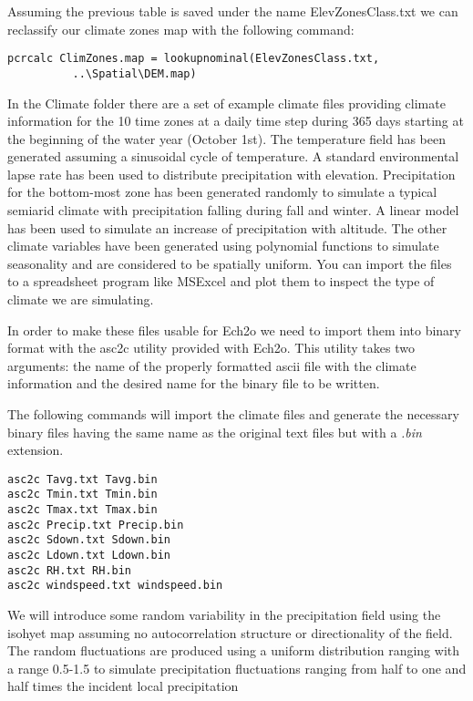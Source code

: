 Assuming the previous table is saved under the name \textsf{ElevZonesClass.txt} we can reclassify our climate zones map with the following command:

\begin{verbatim}
pcrcalc ClimZones.map = lookupnominal(ElevZonesClass.txt,
          ..\Spatial\DEM.map)
\end{verbatim}
 
 In the \textsf{Climate} folder there are a set of example climate files providing climate information for the 10 time zones at a daily time step during 365 days starting at the beginning of the water year (October 1st). The temperature field has been generated assuming a sinusoidal cycle of temperature. A standard environmental lapse rate has been used to distribute precipitation with elevation. Precipitation for the bottom-most zone has been generated randomly to simulate a typical semiarid climate with precipitation falling during fall and winter. A linear model has been used to simulate an increase of precipitation with altitude. The other climate variables have been generated using polynomial functions to simulate seasonality and are considered to be spatially uniform. You can import the files to a spreadsheet program like MSExcel and plot them to inspect the type of climate we are simulating. 

In order to make these files usable for Ech2o we need to import them into binary format with the \textsf{asc2c} utility provided with Ech2o. This utility takes two arguments: the name of the properly formatted ascii file with the climate information and the desired name for the binary file to be written.

The following commands will import the climate files and generate the necessary binary files having the same name as the original text files but with a \textit{.bin} extension.

\begin{verbatim}
asc2c Tavg.txt Tavg.bin
asc2c Tmin.txt Tmin.bin
asc2c Tmax.txt Tmax.bin
asc2c Precip.txt Precip.bin
asc2c Sdown.txt Sdown.bin
asc2c Ldown.txt Ldown.bin
asc2c RH.txt RH.bin
asc2c windspeed.txt windspeed.bin
\end{verbatim} 

We will introduce some random variability in the precipitation field using the isohyet map assuming no autocorrelation structure or directionality of the field. The random fluctuations are produced using a uniform distribution ranging with a range 0.5-1.5 to simulate precipitation fluctuations ranging from half to one and half times the incident local precipitation 

